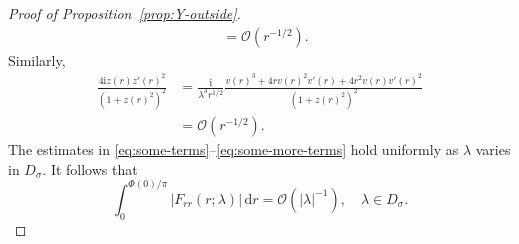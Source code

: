 \documentclass[12pt]{amsart}
\numberwithin{equation}{section}
\newcommand{\dd}{\mathrm{d}}
\newcommand{\ii}{\mathrm{i}}
\newcommand{\SP}{\lambda}
\newcommand{\phaseint}{\Phi}
\newcommand{\rr}{r}
\newcommand{\bigo}[1]{ \mathcal{O}\! \left( #1 \right) }
\begin{document}
\begin{proof}[Proof of Proposition~\ref{prop:Y-outside}]
\begin{equation}
\begin{split}
&=\bigo{\rr^{-1/2}}.
\end{split}
\label{eq:some-terms}
\end{equation}
Similarly,
\begin{equation}
\begin{split}
\frac{4\ii z(\rr)z'(\rr)^2}{(1+z(\rr)^2)^2}&=\frac{\ii}{\SP^3\rr^{1/2}}\frac{v(\rr)^3 + 4\rr v(\rr)^2v'(\rr) +4\rr^2v(\rr)v'(\rr)^2}{(1+z(\rr)^2)^2}\\
&=\bigo{\rr^{-1/2}}.
\end{split}
\label{eq:some-more-terms}
\end{equation}
The estimates in \eqref{eq:some-terms}--\eqref{eq:some-more-terms} hold uniformly as $\SP$ varies in $D_\sigma$.
It follows that 
\begin{equation}
\int_0^{\phaseint(0)/\pi}|F_{\rr\rr}(\rr;\SP)|\,\dd \rr=\bigo{|\SP|^{-1}},\quad\SP\in D_\sigma.
\label{eq:Ftt-L1-outside}
\end{equation}  


\end{proof}
\end{document}
